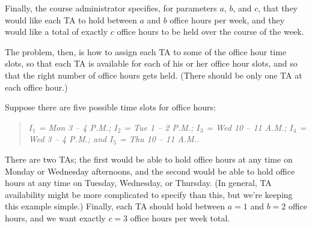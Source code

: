 \documentclass[12pt,letterpaper]{article}
\begin{document}
Finally, the course administrator specifies, for parameters $a$, $b$, and
$c$, that they would like each TA to hold between $a$ and $b$ office hours per
week, and they would like a total of exactly $c$ office hours to be held over
the course of the week.

The problem, then, is how to assign each TA to some of the office hour
time slots, so that each TA is available for each of his or her office hour
slots, and so that the right number of office hours gets held. (There
should be only one TA at each office hour.)

{\eg \rm Suppose there are five possible time slots for office hours:}
\begin{quote}
{\it $I_1$ = Mon 3 -- 4 P.M.; $I_2$ = Tue 1 -- 2 P.M.; $I_3$ = Wed 10 -- 11 A.M.; $I_4$ = Wed 3 -- 4 P.M.; and $I_5$ = Thu 10 -- 11 A.M..}
\end{quote}
There are two TAs; the first would be able to hold office hours at any
time on Monday or Wednesday afternoons, and the second would be able
to hold office hours at any time on Tuesday, Wednesday, or Thursday.
(In general, TA availability might be more complicated to specify than
this, but we're keeping this example simple.) Finally, each TA should hold
between $a = 1$ and $b = 2$ office hours, and we want exactly $c = 3$ office hours
per week total.
\end{document}
